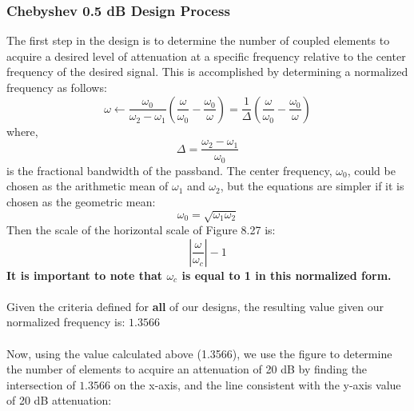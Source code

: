 \documentclass{article}
\begin{document}
\subsubsection{Chebyshev 0.5 dB Design Process}
The first step in the design is to determine the number of coupled elements to acquire a desired level of attenuation at a specific frequency relative to the center frequency of the desired signal. This is accomplished by determining a normalized frequency as follows:
\begin{equation}
    \omega \leftarrow \dfrac{\omega_0}{\omega_2 - \omega_1} \left( \dfrac{\omega}{\omega_0} - \dfrac{\omega_0}{\omega} \right) = \dfrac{1}{\Delta} \left( \dfrac{\omega}{\omega_0} - \dfrac{\omega_0}{\omega} \right)
\end{equation}
where,\\
\begin{equation}
    \Delta = \dfrac{\omega_2 - \omega_1}{\omega_0}
\end{equation}
is the fractional bandwidth of the passband. The center frequency, $\omega_0$, could be chosen as the arithmetic mean of $\omega_1$ and $\omega_2$, but the equations are simpler if it is chosen as the geometric mean:
\begin{equation}
    \omega_0 = \sqrt{\omega_1 \omega_2}
\end{equation}
Then the scale of the horizontal scale of Figure 8.27 is:
\begin{equation}
    \left| \dfrac{\omega}{\omega_c} \right| - 1
\end{equation}
\textbf{It is important to note that $\omega_c$ is equal to 1 in this normalized form.}\cite{Pozar}\\
\textbf{ }\\
Given the criteria defined for \textbf{all} of our designs, the resulting value given our normalized frequency is: $1.3566$\\
\text{ }\\
Now, using the value calculated above (1.3566), we use the figure to determine the number of elements to acquire an attenuation of 20 dB by finding the intersection of $1.3566$ on the x-axis, and the line consistent with the y-axis value of 20 dB attenuation:
\newpage
\end{document}

